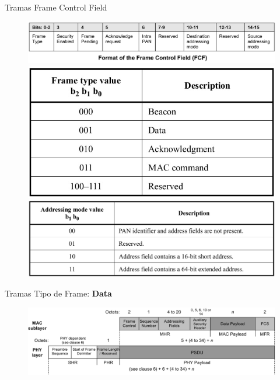 \documentclass[aspectratio=169]{beamer}
\begin{document}
\begin{frame}[t]{Tramas}
Frame Control Field
	\begin{figure}[H]
	\centering
		\includegraphics[height=.3\textheight]{./imagenes/FCF.jpg}\\
		\vspace{20px}
		\hspace{-10px}
		\includegraphics[height=.37\textheight]{./imagenes/frametype.jpg}
		\includegraphics[height=.37\textheight]{./imagenes/addressingmode.jpg}
	\end{figure} 	
\end{frame}

\begin{frame}[t]{Tramas}
Tipo de Frame: \textbf{Data}
\vspace{10px}
	\begin{figure}[H]
		\includegraphics[width=1\textwidth]{./imagenes/data.jpg}
	\end{figure}	  	  	
\end{frame}
\end{document}
